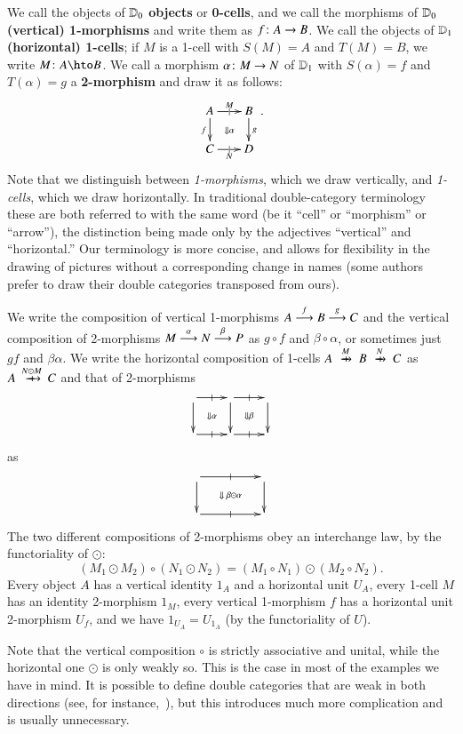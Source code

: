 \documentclass{amsart}
\begin{document}
We call the objects of $\lD_0$ \textbf{objects} or \textbf{0-cells},
and we call the morphisms of $\lD_0$ \textbf{(vertical) 1-morphisms}
and write them as $f\maps A\to B$.  We call the objects of $\lD_1$
\textbf{(horizontal) 1-cells}; if $M$ is a 1-cell with $S(M)=A$ and
$T(M)=B$, we write $M\maps A\hto B$.  We call a morphism $\alpha\maps
M\to N$ of $\lD_1$ with $S(\alpha)=f$ and $T(\alpha)=g$ a
\textbf{2-morphism} and draw it as follows:
\begin{equation}\label{eq:square}
  \xymatrix@-.5pc{
    A \ar[r]|{|}^{M}  \ar[d]_f \ar@{}[dr]|{\Downarrow\alpha}&
    B\ar[d]^g\\
    C \ar[r]|{|}_N & D
  }.
\end{equation}
Note that we distinguish between \emph{1-morphisms}, which we draw
vertically, and \emph{1-cells}, which we draw horizontally.  In
traditional double-category terminology these are both referred to
with the same word (be it ``cell'' or ``morphism'' or ``arrow''), the
distinction being made only by the adjectives ``vertical'' and
``horizontal.''  Our terminology is more concise, and allows for
flexibility in the drawing of pictures without a corresponding change
in names (some authors prefer to draw their double categories
transposed from ours).

We write the composition of vertical 1-morphisms $A\too[f] B\too[g] C$
and the vertical composition of 2-morphisms $M\too[\alpha]
N\too[\beta] P$ as $g\circ f$ and $\beta\circ\alpha$, or sometimes
just $gf$ and $\beta\alpha$.  We write the horizontal composition of
1-cells $A\xhto{M} B \xhto{N} C$ as $A\xhto{N\odot M} C$ and that of
2-morphisms
\[\vcenter{\xymatrix{ \ar[r]|-@{|}^-{} \ar[d] \ar@{}[dr]|{\Downarrow\alpha} &
     \ar[r]|-@{|}^-{} \ar[d] \ar@{}[dr]|{\Downarrow\beta} &\ar[d]\\
  \ar[r]|-@{|}_-{} & \ar[r]|-@{|}_-{} & }}\]
as
\[\vcenter{\xymatrix@C=4pc{ \ar[r]|-@{|}^-{} \ar[d] \ar@{}[dr]|{\Downarrow\;\be\odot\al} &  \ar[d]\\
  \ar[r]|-@{|}_-{} & }}\]
The two different compositions of 2-morphisms obey an interchange law,
by the functoriality of $\odot$:
\[(M_1\odot M_2) \circ (N_1\odot N_2) = (M_1\circ N_1)\odot (M_2\circ N_2).
\]
Every object $A$ has a vertical identity $1_A$ and a horizontal unit
$U_A$, every 1-cell $M$ has an identity 2-morphism $1_M$, every
vertical 1-morphism $f$ has a horizontal unit 2-morphism $U_f$, and we
have $1_{U_A} = U_{1_A}$ (by the functoriality of $U$).

Note that the vertical composition $\circ$ is strictly associative and
unital, while the horizontal one $\odot$ is only weakly so.  This is
the case in most of the examples we have in mind.  It is possible to
define double categories that are weak in both directions (see, for
instance,~\cite{verity:base-change}), but this introduces much more
complication and is usually unnecessary.
\end{document}
